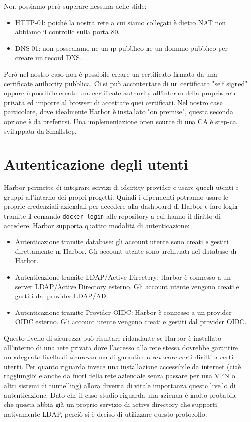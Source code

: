 \documentclass[12pt,a4paper]{report}
\begin{document}
Non possiamo però superare nessuna delle sfide: 
\begin{itemize}
    \item HTTP-01: poiché la nostra rete a cui siamo collegati è dietro NAT non abbiamo il controllo sulla porta 80.
    \item DNS-01: non possediamo ne un ip pubblico ne un dominio pubblico per creare un record DNS.
\end{itemize}
Però nel nostro caso non è possibile creare un certificato firmato da una certificate authority pubblica.
Ci si può accontentare di un certificato "self signed" oppure è possibile create una certificate authority all'interno della propria rete privata ed imporre al browser di accettare quei certificati. Nel nostro caso particolare, dove idealmente Harbor è installato "on premise", questa seconda opzione è da preferirsi. Una implementazione open source di una CA è step-ca, sviluppata da Smallstep.

\chapter{Autenticazione degli utenti}
Harbor permette di integrare servizi di identity provider e usare quegli utenti e gruppi all'interno dei propri progetti. Quindi i dipendenti potranno usare le proprie credenziali aziendali per accedere alla dashboard di Harbor e fare login tramite il comando \texttt{docker login} alle repository a cui hanno il diritto di accedere. Harbor supporta quattro modalità di autenticazione:
\begin{itemize}
    \item Autenticazione tramite database: gli account utente sono creati e gestiti direttamente in Harbor. Gli account utente sono archiviati nel database di Harbor.
    \item Autenticazione tramite LDAP/Active Directory: Harbor è connesso a un server LDAP/Active Directory esterno. Gli account utente vengono creati e gestiti dal provider LDAP/AD.
    \item Autenticazione tramite Provider OIDC: Harbor è connesso a un provider OIDC esterno. Gli account utente vengono creati e gestiti dal provider OIDC.
\end{itemize}
Questo livello di sicurezza può risultare ridondante se Harbor è installato all'interno di una rete privata dove l'accesso alla rete stessa dovrebbe garantire un adeguato livello di sicurezza ma di garantire o revocare certi diritti a certi utenti. Per quanto riguarda invece una installazione accessibile da internet (cioè raggiungibile anche da fuori della rete aziendale senza passare per una VPN o altri sistemi di tunnelling) allora diventa di vitale importanza questo livello di autenticazione.
Dato che il caso studio riguarda una azienda è molto probabile che questa abbia già un proprio servizio di active directory che supporti nativamente LDAP, perciò si è deciso di utilizzare questo protocollo.
\end{document}

